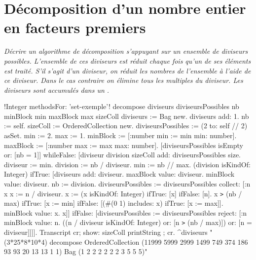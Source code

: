 \section{D\'ecomposition d'un nombre entier en facteurs premiers}

{\em D\'ecrire un algorithme de d\'ecomposition  s'appuyant sur un ensemble
de diviseurs possibles. L'ensemble de ces diviseurs est r\'eduit chaque fois
qu'un de ses \'el\'ements est trait\'e. S'il s'agit d'un diviseur, on
r\'eduit les nombres de l'ensemble \`a l'aide de ce diviseur. Dans le cas
contraire on \'elimine tous les multiples du diviseur. Les diviseurs
sont accumul\'es dans un .}

\begin{scode}
!Integer methodsFor: 'set-exemple'!
decompose
   \stBar diviseurs diviseursPossibles nb minBlock min maxBlock max sizeColl \stBar
   diviseurs := Bag new.
   diviseurs add: 1. nb := self.
   sizeColl := OrderedCollection new.
   diviseursPossibles := (2 to: self // 2) asSet.
   min := 2. max := 1.
   minBlock := [:number \stBar min := min min: number].
   maxBlock := [:number \stBar max := max max: number].
   [diviseursPossibles isEmpty or: [nb = 1]]
      whileFalse: 
         [\stBar diviseur division \stBar
         sizeColl add: diviseursPossibles size.
         diviseur := min.
         division := nb / diviseur.
         min := nb // max.
         (division isKindOf: Integer)
            ifTrue: 
               [diviseurs add: diviseur.
               maxBlock value: diviseur.
               minBlock value: diviseur.
               nb := division.
               diviseursPossibles := diviseursPossibles
                        collect: 
                           [:n \stBar 
                           \stBar x \stBar x := n / diviseur.
                           x := (x isKindOf: Integer)    ifTrue: [x]    ifFalse: [n].
                           x \texttt{>} (nb / max)
                              ifTrue: [x := min]
                              ifFalse: [(#(0 1) includes: x) ifTrue: [x := max]].
                           minBlock value: x.
                           x]]
            ifFalse: [diviseursPossibles := diviseursPossibles
                        reject: 
                           [:n \stBar  minBlock value: n.
                           ((n / diviseur isKindOf: Integer) or: [n \texttt{>} (nb / max)])
                              or: [n = diviseur]]]].
   Transcript cr; show: sizeColl printString ; cr.
   ^diviseurs
"(3*25*8*10*4) decompose  
 OrderedCollection (11999 5999 2999 1499 749 374 186 93 93 20 13 13 1 1)
 Bag (1 2 2 2 2 2 2 3 5 5 5)"
\end{scode}

